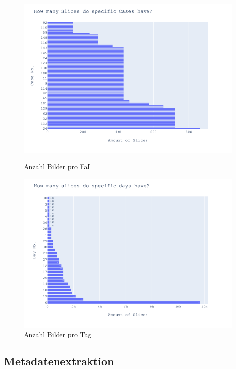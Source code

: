 \begin{figure}[!htb]
   \begin{minipage}{0.48\textwidth}
     \centering
     \includegraphics[width=1.2\linewidth]{bilder/slice_per_case}
     \caption{Anzahl Bilder pro Fall}\label{Fig:slice_per_case}
   \end{minipage}\hfill
   \begin{minipage}{0.48\textwidth}
     \centering
     \includegraphics[width=1.2\linewidth]{bilder/slices_per_day}
     \caption{Anzahl Bilder pro Tag}\label{Fig:slice_per_day}
   \end{minipage}
\end{figure}

\subsection{Metadatenextraktion}





